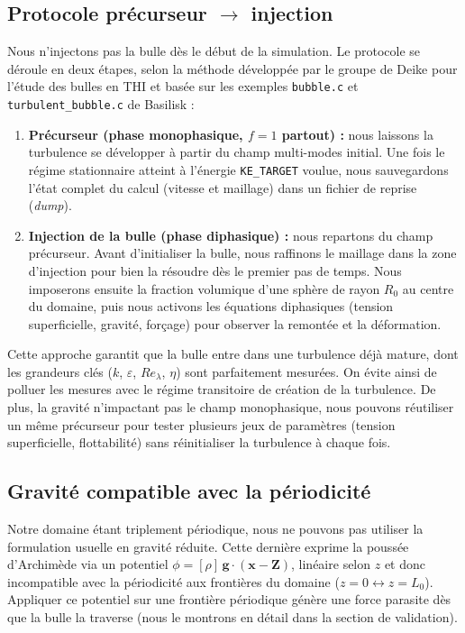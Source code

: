 \subsection{Protocole précurseur $\to$ injection}
\label{subsec:protocole}

Nous n'injectons pas la bulle dès le début de la simulation. Le protocole se déroule en deux étapes, selon la méthode développée par le groupe de Deike pour l'étude des bulles en THI \cite{riviere2021,liu2024} et basée sur les exemples \texttt{bubble.c} \cite{basilisk_bubble} et \texttt{turbulent\_bubble.c} \cite{basilisk_turbbubble} de Basilisk :

\begin{enumerate}
    \item \textbf{Précurseur (phase monophasique, $f=1$ partout) :} nous laissons la turbulence se développer à partir du champ multi-modes initial. Une fois le régime stationnaire atteint à l'énergie \texttt{KE\_TARGET} voulue, nous sauvegardons l'état complet du calcul (vitesse et maillage) dans un fichier de reprise (\emph{dump}).
    
    \item \textbf{Injection de la bulle (phase diphasique) :} nous repartons du champ précurseur. Avant d'initialiser la bulle, nous raffinons le maillage dans la zone d'injection pour bien la résoudre dès le premier pas de temps. Nous imposerons ensuite la fraction volumique d'une sphère de rayon $R_0$ au centre du domaine, puis nous activons les équations diphasiques (tension superficielle, gravité, forçage) pour observer la remontée et la déformation.
\end{enumerate}

Cette approche garantit que la bulle entre dans une turbulence déjà mature, dont les grandeurs clés ($k$, $\varepsilon$, $Re_\lambda$, $\eta$) sont parfaitement mesurées. On évite ainsi de polluer les mesures avec le régime transitoire de création de la turbulence. De plus, la gravité n'impactant pas le champ monophasique, nous pouvons réutiliser un même précurseur pour tester plusieurs jeux de paramètres (tension superficielle, flottabilité) sans réinitialiser la turbulence à chaque fois.

\subsection{Gravité compatible avec la périodicité}
\label{subsec:gravite}

Notre domaine étant triplement périodique, nous ne pouvons pas utiliser la formulation usuelle en gravité réduite. Cette dernière exprime la poussée d'Archimède via un potentiel $\phi = [\rho]\,\mathbf{g}\cdot(\mathbf{x}-\mathbf{Z})$, linéaire selon $z$ et donc incompatible avec la périodicité aux frontières du domaine ($z=0 \leftrightarrow z=L_0$). Appliquer ce potentiel sur une frontière périodique génère une force parasite dès que la bulle la traverse (nous le montrons en détail dans la section de validation).

